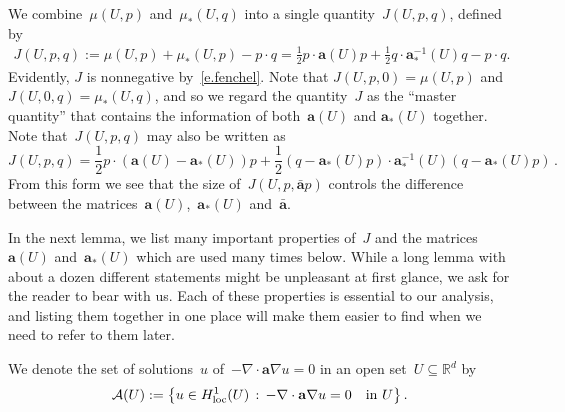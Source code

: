 \documentclass[11pt]{article} %
\numberwithin{equation}{section}
\theoremstyle{definition}
\let\originalleft\left
\let\originalright\right
\renewcommand{\left}{\mathopen{}\mathclose\bgroup\originalleft}
\renewcommand{\right}{\aftergroup\egroup\originalright}
\newcommand*{\Rd}{\ensuremath{\mathbb{R}^d}}
\renewcommand{\a}{\mathbf{a}}
\newcommand{\ahom}{\bar{\a}}
\begin{document}
We combine~$\mu(U,p)$ and~$\mu_*(U,q)$ into a single quantity~$J(U,p,q)$, defined by
\begin{align}
\label{e.Jaas}
J(U,p,q) 
:=
\mu(U,p) + \mu_*(U,p) - p\cdot q
=
\frac12p\cdot \a(U) p + \frac12 q\cdot \a_*^{-1}(U)q - p\cdot q. 
\end{align}
Evidently, $J$ is nonnegative by~\eqref{e.fenchel}. Note that $J(U,p,0) = \mu(U,p)$ and $J(U,0,q) = \mu_*(U,q)$, and so we regard the quantity~$J$ as the ``master quantity'' that contains the information of both~$\a(U)$ and $\a_*(U)$ together. 
Note that~$J(U,p,q)$ may also be written as
\begin{equation}
\label{e.magic}
J(U,p,q) 
= 
\frac12 p \cdot (\a(U) - \a_*(U)) p  +   \frac12 (q  - \a_*(U) p) \cdot \a_*^{-1}(U) (q  - \a_*(U)  p)
\,.
\end{equation}
From this form we see that the size of~$J(U,p,\ahom p)$ controls the difference between the matrices~$\a (U)$,~$\a_*(U)$ and~$\ahom$. 

\smallskip

In the next lemma, we list many important properties of~$J$ and the matrices~$\a(U)$ and~$\a_*(U)$ which are used many times below. While a long lemma with about a dozen different statements might be unpleasant at first glance, we ask for the reader to bear with us. Each of these properties is essential to our analysis, and listing them together in one place will make them easier to find when we need to refer to them later. 

\smallskip

We denote the set of solutions~$u$ of~$-\nabla \cdot \a\nabla u=0$ in an open set~$U\subseteq\Rd$ by 
\begin{equation}
\label{e.def.AU}
\mathcal{A}(U) := 
\left\{ 
u\in H^1_{\mathrm{loc}}(U)
\,:\,
-\nabla \cdot \a\nabla u = 0 \quad \mbox{in} \ U \right\}
\,.
\end{equation}
\end{document}
